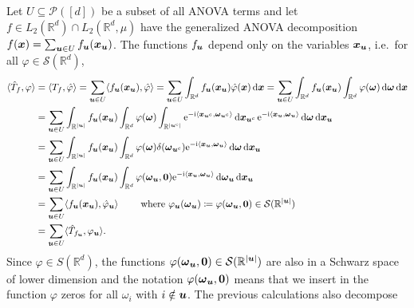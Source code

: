 \documentclass{article}
\renewcommand{\vec}[1]{\ensuremath \mathbf{\boldsymbol{#1}}}
\renewcommand{\phi}{\varphi}
\newcommand{\w}{\ensuremath{\vec \omega}}
\newcommand{\x}{\ensuremath{\vec x}}
\newcommand{\R}{\ensuremath{\mathbb{R}}}
\newcommand{\dx}{\mathrm{d}}
\newcommand{\e}{\mathrm{e}}
\newcommand{\im}{\mathrm{i}}
\renewcommand{\d}{\, \mathrm{d}}
\theoremstyle{definition}
\numberwithin{equation}{section}
\begin{document}
Let $U\subseteq \mathcal P([d])$ be a subset of all ANOVA terms and let $f\in L_2(\R^d)\cap L_2(\R^d,\mu)$ have the generalized ANOVA decomposition $f(\x) = \sum_{\vec u \in U}f_{\vec u}(\x_{\vec u})$. The functions $f_{\vec u}$ depend only on the variables $\x_{\vec u}$, i.e.~for all $\phi \in \mathcal S(\R^{d})$,
\begin{align*}
\langle \hat T_f ,\phi\rangle  &= \langle T_f ,\hat \phi\rangle = \sum_{\vec u\in U} \langle f_{\vec u}(\x_{\vec u}),\hat \phi\rangle 
= \sum_{\vec u\in U} \int_{\R^d} f_{\vec u} (\x_{\vec u}) \hat \phi(\x)\d \x 
= \sum_{\vec u\in U} \int_{\R^d} f_{\vec u} (\x_{\vec u}) \int_{\R^d} \phi(\w) \d \w \d \x
\\
&= \sum_{\vec u\in U} \int_{\R^{|\vec u|}} f_{\vec u} (\x_{\vec u})   \int_{\R^d} \phi(\w) \int_{\R^{|\vec u^c|}} \e^{-\im \langle \x_{\vec u^c},\w_{\vec u^c}\rangle} \d \x_{\vec u^c} \, \e^{-\im \langle \x_{\vec u},\w_{\vec u}\rangle} \d \w \d \x_{\vec u}
\\
&= \sum_{\vec u\in U} \int_{\R^{|\vec u|}} f_{\vec u} (\x_{\vec u}) \int_{\R^d} \phi(\w) \delta(\w_{\vec u^c})\e^{-\im \langle \x_{\vec u},\w_{\vec u}\rangle} \d \w \d \x_{\vec u}\\
&= \sum_{\vec u\in U} \int_{\R^{|\vec u|}} f_{\vec u} (\x_{\vec u}) \int_{\R^d} \phi(\w_{\vec u},\vec 0) \e^{-\im \langle \x_{\vec u},\w_{\vec u}\rangle} \d \w_{\vec u}  \d \x_{\vec u} \\
&= \sum_{\vec u\in U} \langle f_{\vec u}(\x_{\vec u}),\hat \phi_{\vec u}\rangle  \qquad \text{ where } \phi_{\vec u}(\w_\vec u) \coloneqq \phi(\w_{\vec u},\vec 0) \in  \mathcal S(\R^{|\vec u|})\\
&= \sum_{\vec u\in U} \langle \hat T_{f_\vec u},\phi_{\vec u}\rangle.
\end{align*}%
Since $\phi\in S(\R^{d})$, the functions $\phi(\w_{\vec u},\vec 0) \in  \mathcal S(\R^{|\vec u|})$ are also in a Schwarz space of lower dimension and the notation $\phi(\w_{\vec u},\vec 0)$ means that we insert in the function $\phi$ zeros for all $\omega_i$ with $i \notin \vec u$. %
The previous calculations also decompose %
\end{document}
